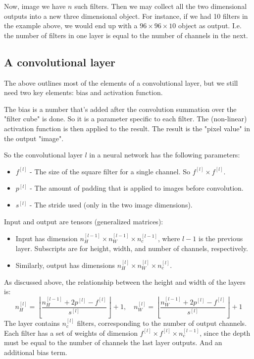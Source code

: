 \documentclass[12pt, a4paper]{article}
\numberwithin{equation}{section}
\begin{document}
Now, image we have $n$ such filters. Then we may collect all the two dimensional outputs into a new three dimensional object. For instance, if we had 10 filters in the example above, we would end up with a $96\times 96\times 10$ object as output. I.e. the number of filters in one layer is equal to the number of channels in the next.

\subsection{A convolutional layer}
The above outlines most of the elements of a convolutional layer, but we still need two key elements: bias and activation function.

The bias is a number that's added after the convolution summation over the "filter cube" is done. So it is a parameter specific to each filter. The (non-linear) activation function is then applied to the result. The result is the "pixel value" in the output "image".

So the convolutional layer $l$ in a neural network has the following parameters:
\begin{itemize}
\item $f^{[l]}$ - The size of the square filter for a single channel. So $f^{[l]}\times f^{[l]}$.
\item $p^{[l]}$ - The amount of padding that is applied to images before convolution.
\item $s^{[l]}$ - The stride used (only in the two image dimensions).
\end{itemize}
Input and output are tensors (generalized matrices):
\begin{itemize}
\item Input has dimension $n_H^{[l-1]}\times n_W^{[l-1]}\times n_c^{[l-1]}$, where $l-1$ is the previous layer. Subscripts are for height, width, and number of channels, respectively.
\item Similarly, output has dimensions $n_H^{[l]}\times n_W^{[l]}\times n_c^{[l]}$.
\end{itemize}
As discussed above, the relationship between the height and width of the layers is:
\begin{equation}
n_H^{[l]}=\left\lfloor\frac{n_H^{[l-1]}+2p^{[l]}-f^{[l]}}{s^{[l]}}\right\rfloor+1,\quad n_W^{[l]}=\left\lfloor\frac{n_W^{[l-1]}+2p^{[l]}-f^{[l]}}{s^{[l]}}\right\rfloor+1
\end{equation}
The layer contains $n_c^{[l]}$ filters, corresponding to the number of output channels. Each filter has a set of weights of dimension $f^{[l]}\times f^{[l]}\times n_c^{[l-1]}$, since the depth must be equal to the number of channels the last layer outputs. And an additional bias term.
\end{document}
